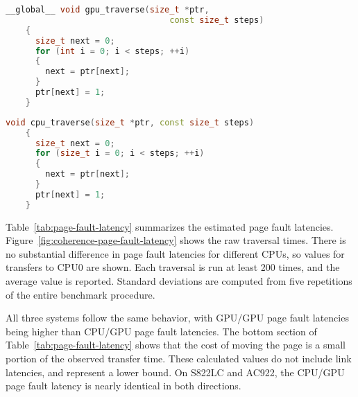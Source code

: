 \begin{minipage}{\textwidth}
\begin{lstlisting}[language=c++, caption=GPU linked list traversal kernel for Algorithm~\ref{alg:um-latency-gpu}., label=lst:gpu-traversal]
	__global__ void gpu_traverse(size_t *ptr,
	                             const size_t steps)
	{
	  size_t next = 0;
	  for (int i = 0; i < steps; ++i)
	  {
		next = ptr[next];
	  }
	  ptr[next] = 1;
	}
\end{lstlisting}
\end{minipage}

\begin{minipage}{\textwidth}
\begin{lstlisting}[language=c++, caption=CPU linked list traversal function for Algorithm~\ref{alg:um-latency-cpu}., label=lst:cpu-traversal]
	void cpu_traverse(size_t *ptr, const size_t steps)
	{
	  size_t next = 0;
	  for (size_t i = 0; i < steps; ++i)
	  {
		next = ptr[next];
	  }
	  ptr[next] = 1;
	}
\end{lstlisting}
\end{minipage}

Table~\ref{tab:page-fault-latency} summarizes the estimated page fault latencies.
Figure~\ref{fig:coherence-page-fault-latency} shows the raw traversal times.
There is no substantial difference in page fault latencies for different CPUs, so values for transfers to CPU0 are shown.
Each traversal is run at least 200 times, and the average value is reported.
Standard deviations are computed from five repetitions of the entire benchmark procedure.

All three systems follow the same behavior, with GPU/GPU page fault latencies being higher than CPU/GPU page fault latencies.
The bottom section of Table~\ref{tab:page-fault-latency} shows that the cost of moving the page is a small portion of the observed transfer time.
These calculated values do not include link latencies, and represent a lower bound.
On S822LC and AC922, the CPU/GPU page fault latency is nearly identical in both directions.


